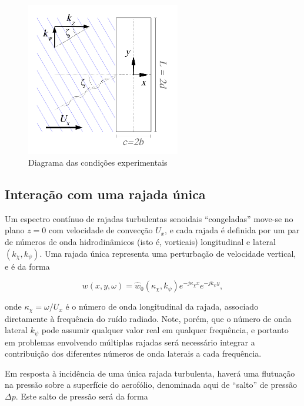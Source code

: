 \documentclass[a4paper, 11pt, twoside]{article}
\begin{document}
\begin{figure}[htbp]
	\centering
	\includegraphics[width=0.6\textwidth]{../figures/Oblique_Gust_aerofoil.pdf}
	\caption{Diagrama das condições experimentais}
	\label{fig:experimental_setup}
\end{figure}

\subsection{Interação com uma rajada única}

Um espectro contínuo de rajadas turbulentas senoidais ``congeladas'' move-se no plano $z=0$ com velocidade de convecção $U_x$, e cada rajada é definida por um par de números de onda hidrodinâmicos (isto é, vorticais) longitudinal e lateral $(k_\chi, k_\psi)$. Uma rajada única representa uma perturbação de velocidade vertical, e é da forma

\begin{equation}
w(x, y, \omega) = \hat{w}_0(\kappa_\chi, k_\psi) e^{-j\kappa_\chi x} e^{-j k_\psi y },
\end{equation}

\noindent onde $\kappa_\chi = \omega/U_x$ é o número de onda longitudinal da rajada, associado diretamente à frequência do ruído radiado. Note, porém, que o número de onda lateral $k_\psi$ pode assumir qualquer valor real em qualquer frequência, e portanto em problemas envolvendo múltiplas rajadas será necessário integrar a contribuição dos diferentes números de onda laterais a cada frequência.

Em resposta à incidência de uma única rajada turbulenta, haverá uma flutuação na pressão sobre a superfície do aerofólio, denominada aqui de ``salto'' de pressão $\Delta p$. Este salto de pressão será da forma
\end{document}
